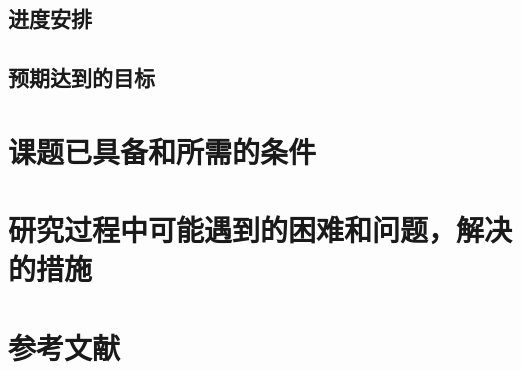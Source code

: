 \documentclass[fontset=windows,toc=true,type=bachelor,stage=opening,campus=weihai]{hithesisart}
\begin{document}
\subsection{进度安排}
\subsection{预期达到的目标}
\section{课题已具备和所需的条件}
\section{研究过程中可能遇到的困难和问题，解决的措施}
\section{参考文献}



\makebackcover
\end{document}
